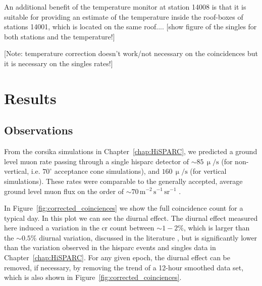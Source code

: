An additional benefit of the temperature monitor at station 14008 is that it is suitable for providing an estimate of the temperature inside the roof-boxes of stations 14001, which is located on the same roof.... [show figure of the singles for both stations and the temperature!]


[Note: temperature correction doesn't work/not necessary on the coincidences but it is necessary on the singles rates!]





\section{Results}\label{sec:HS_14008_results}

\subsection{Observations}\label{sec:HS_14008_observations}

From the \gls{corsika} simulations in Chapter~\ref{chap:HiSPARC}, we predicted a ground level muon rate passing through a single \gls{hisparc} detector of $\sim 85 \, \upmu/\mathrm{s}$ (for non-vertical, i.e. $70^\circ$ acceptance cone simulations), and $160 \, \upmu/\mathrm{s}$ (for vertical simulations). These rates were comparable to the generally accepted, average ground level muon flux on the order of $\sim 70 \, \mathrm{m}^{-2}\,\mathrm{s}^{-1}\,\mathrm{sr}^{-1}$ \citep{cecchini_cosmic_2000, blackmore_terrestrial_2015, pereira_ground_2020, particle_data_group_review_2020}.


In Figure~\ref{fig:corrected_coinciences} we show the full coincidence count for a typical day. In this plot we can see the diurnal effect. The diurnal effect measured here induced a variation in the \gls{cr} count between $\sim 1-2 \%$, which is larger than the $\sim 0.5 \%$ diurnal variation, discussed in the literature \citep{mishra_study_2007, mishra_cosmic_2008, dubey_cosmic_2016, thomas_decadal_2017}, but is significantly lower than the variation observed in the \gls{hisparc} events and singles data in Chapter~\ref{chap:HiSPARC}. For any given epoch, the diurnal effect can be removed, if necessary, by removing the trend of a 12-hour smoothed data set, which is also shown in Figure~\ref{fig:corrected_coinciences}.

